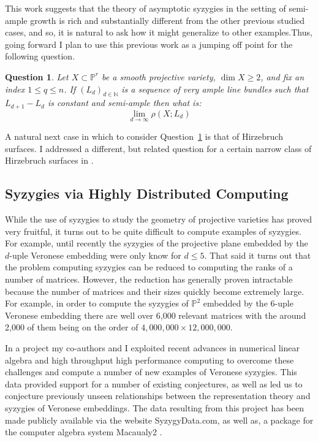 \documentclass[10pt,reqno]{amsart}
\newtheorem{question}[lemma]{Question}
\theoremstyle{remark}
\newcommand{\N}{\mathbb{N}}
\renewcommand{\P}{\mathbb{P}}
\begin{document}
This work suggests that the theory of asymptotic syzygies in the setting of semi-ample growth is rich and substantially different from the other previous studied cases, and so, it is natural to ask how it might generalize to other examples.Thus, going forward I plan to use this previous work as a jumping off point for the following question.  

\begin{question}\label{quest:semi-ample}
Let $X\subset \P^r$ be a smooth projective variety, $\dim X \geq2$, and fix an index $1\leq q \leq n$. If $(L_{d})_{d\in\N}$ is a sequence of very ample line bundles such that $L_{d+1}-L_{d}$ is constant and semi-ample then what is:
\[
\lim_{d\to\infty} \rho\left(X;L_{d}\right)
\]
\end{question}

A natural next case in which to consider Question~\ref{quest:semi-ample} is that of Hirzebruch surfaces. I addressed a different, but related question for a certain narrow class of Hirzebruch surfaces in \cite{bruce19-hirzebruch}.

\subsection{Syzygies via Highly Distributed Computing}

While the use of syzygies to study the geometry of projective varieties has proved very fruitful, it turns out to be quite difficult to compute examples of syzygies. For example, until recently the syzygies of the projective plane embedded by the $d$-uple Veronese embedding were only know for $d\leq 5$. That said it turns out that the problem computing syzygies can be reduced to computing the ranks of a number of matrices. However, the reduction has generally proven intractable because the number of matrices and their sizes quickly become extremely large. For example, in order to compute the syzygies of $\P^2$ embedded by the $6$-uple Veronese embedding there are well over 6,000 relevant matrices with the around 2,000 of them being on the order of $4,000,000 \times 12,000,000$. 

In a project my co-authors and I exploited recent advances in numerical linear algebra and high throughput high performance computing to overcome these challenges and compute a number of new examples of Veronese syzygies. This data provided support for a number of existing conjectures, as well as led us to conjecture previously unseen relationships between the representation theory and syzygies of Veronese embeddings. 
The data resulting from this project has been made publicly available via the website SyzygyData.com, as well as, a package for the computer algebra system Macaualy2 \cite{bruceErman19}.
\end{document}

